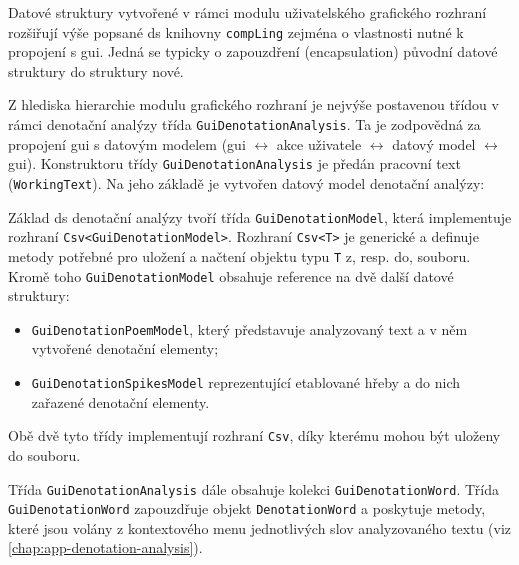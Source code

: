 \documentclass[dp.tex]{subfiles}
\begin{document}
Datové struktury vytvořené v rámci modulu uživatelského grafického rozhraní rozšiřují výše popsané \acrshort{ds} knihovny \texttt{compLing} zejména o vlastnosti nutné k propojení s \acrshort{gui}. Jedná se typicky o zapouzdření (encapsulation) původní datové struktury do struktury nové.

Z hlediska hierarchie modulu grafického rozhraní je nejvýše postavenou třídou v rámci denotační analýzy třída \texttt{GuiDenotationAnalysis}. Ta je zodpovědná za propojení \acrshort{gui} s datovým modelem (\acrshort{gui} $\leftrightarrow$ akce uživatele $\leftrightarrow$ datový model $\leftrightarrow$ \acrshort{gui}). Konstruktoru třídy \texttt{GuiDenotationAnalysis} je předán pracovní text (\texttt{WorkingText}). Na jeho základě je vytvořen datový model denotační analýzy:

Základ \acrshort{ds} denotační analýzy tvoří třída \texttt{GuiDenotationModel}, která implementuje  rozhraní \texttt{Csv<GuiDenotationModel>}. Rozhraní \texttt{Csv<T>} je generické a definuje metody potřebné pro uložení a načtení objektu typu \texttt{T} z, resp. do, souboru. Kromě toho \texttt{GuiDenotationModel} obsahuje reference na dvě další datové struktury: 
\begin{itemize}
\item \texttt{GuiDenotationPoemModel}, který představuje analyzovaný text a v něm vytvořené denotační elementy;
\item \texttt{GuiDenotationSpikesModel} reprezentující etablované hřeby a do nich zařazené denotační elementy.
\end{itemize}

Obě dvě tyto třídy implementují rozhraní \texttt{Csv}, díky kterému mohou být uloženy do souboru.

Třída \texttt{GuiDenotationAnalysis} dále obsahuje kolekci \texttt{GuiDenotationWord}. Třída \texttt{GuiDenotationWord} zapouzdřuje objekt \texttt{DenotationWord} a poskytuje metody, které jsou volány z kontextového menu jednotlivých slov analyzovaného textu (viz \ref{chap:app-denotation-analysis}).
\end{document}
